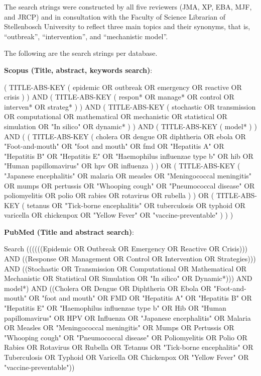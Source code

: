 \documentclass[10pt,letterpaper]{article}
\begin{document}
The search strings were constructed by all five reviewers (JMA, XP, EBA, MJF, and JRCP) and in consultation with the Faculty of Science Librarian of Stellenbosch University to reflect three main topics and their synonyms, that is, ``outbreak'', ``intervention'', and ``mechanistic model''. 

The following are the search strings per database. 

\textbf{Scopus (Title, abstract, keywords search)}:

( TITLE-ABS-KEY ( epidemic  OR  outbreak  OR  emergency  OR  reactive  OR  crisis ) )  AND  ( TITLE-ABS-KEY ( respon*  OR  manage*  OR  control  OR  interven*  OR  strateg* ) )  AND  ( TITLE-ABS-KEY ( stochastic  OR  transmission  OR  computational  OR  mathematical  OR  mechanistic  OR  statistical  OR  simulation  OR  "In silico"  OR  dynamic* ) )  AND  ( TITLE-ABS-KEY ( model* ) )  AND  ( ( TITLE-ABS-KEY ( cholera  OR  dengue  OR  diphtheria  OR  ebola  OR  "Foot-and-mouth"  OR  "foot and mouth"  OR  fmd  OR  "Hepatitis A"  OR  "Hepatitis B"  OR  "Hepatitis E"  OR  "Haemophilus influenzae type b"  OR  hib  OR  "Human papillomavirus"  OR  hpv  OR  influenza ) )  OR  ( TITLE-ABS-KEY ( "Japanese encephalitis"  OR  malaria  OR  measles  OR  "Meningococcal meningitis"  OR  mumps  OR  pertussis  OR  "Whooping cough"  OR  "Pneumococcal disease"  OR  poliomyelitis  OR  polio  OR  rabies  OR  rotavirus  OR  rubella ) )  OR  ( TITLE-ABS-KEY ( tetanus  OR  "Tick-borne encephalitis"  OR  tuberculosis  OR  typhoid  OR  varicella  OR  chickenpox  OR  "Yellow Fever"  OR  "vaccine-preventable" ) ) )

\textbf{PubMed (Title and abstract search)}:

Search ((((((Epidemic OR Outbreak OR Emergency OR Reactive OR Crisis))) AND ((Response OR Management OR Control OR Intervention OR Strategies))) AND ((Stochastic OR Transmission OR Computational OR Mathematical OR Mechanistic OR Statistical OR Simulation OR "In silico" OR Dynamic*))) AND model*) AND ((Cholera OR Dengue OR Diphtheria OR Ebola OR "Foot-and-mouth" OR "foot and mouth" OR FMD OR "Hepatitis A" OR "Hepatitis B" OR "Hepatitis E" OR "Haemophilus influenzae type b" OR Hib OR "Human papillomavirus" OR HPV OR Influenza OR "Japanese encephalitis" OR Malaria OR Measles OR "Meningococcal meningitis" OR Mumps OR Pertussis OR "Whooping cough" OR "Pneumococcal disease" OR Poliomyelitis OR Polio OR Rabies OR Rotavirus OR Rubella OR Tetanus OR "Tick-borne encephalitis" OR Tuberculosis OR Typhoid OR Varicella OR Chickenpox OR "Yellow Fever" OR "vaccine-preventable"))
\end{document}
